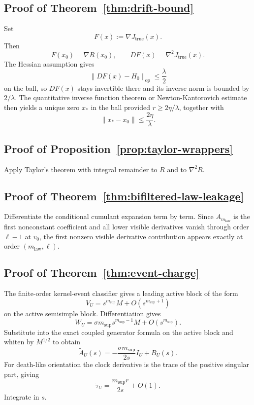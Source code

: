 \documentclass[11pt,a4paper]{article}
\numberwithin{equation}{section}
\theoremstyle{thmcompact}
\theoremstyle{remark}
\begin{document}
\subsection*{Proof of Theorem~\ref{thm:drift-bound}}
Set
\begin{equation}
F(x):=\nabla J_{\mathrm{true}}(x).
\end{equation}
Then
\begin{equation}
F(x_0)=\nabla R(x_0),
\qquad
DF(x)=\nabla^2J_{\mathrm{true}}(x).
\end{equation}
The Hessian assumption gives
\begin{equation}
\|DF(x)-H_0\|_{\mathrm{op}}\le \frac{\lambda}{2}
\end{equation}
on the ball, so $DF(x)$ stays invertible there and its inverse norm is bounded by $2/\lambda$. The quantitative inverse function theorem or Newton-Kantorovich estimate then yields a unique zero $x_*$ in the ball provided $r\ge 2\eta/\lambda$, together with
\begin{equation}
\|x_*-x_0\|\le \frac{2\eta}{\lambda}.
\end{equation}

\subsection*{Proof of Proposition~\ref{prop:taylor-wrappers}}
Apply Taylor's theorem with integral remainder to $R$ and to $\nabla^2R$.

\subsection*{Proof of Theorem~\ref{thm:bifiltered-law-leakage}}
Differentiate the conditional cumulant expansion term by term. Since $A_{m_{\mathrm{law}}}$ is the first nonconstant coefficient and all lower visible derivatives vanish through order $\ell-1$ at $v_0$, the first nonzero visible derivative contribution appears exactly at order $(m_{\mathrm{law}},\ell)$.

\subsection*{Proof of Theorem~\ref{thm:event-charge}}
The finite-order kernel-event classifier gives a leading active block of the form
\begin{equation}
V_U=s^{m_{\mathrm{sup}}}M+O(s^{m_{\mathrm{sup}}+1})
\end{equation}
on the active semisimple block. Differentiation gives
\begin{equation}
W_U=\sigma m_{\mathrm{sup}}s^{m_{\mathrm{sup}}-1}M+O(s^{m_{\mathrm{sup}}}).
\end{equation}
Substitute into the exact coupled generator formula on the active block and whiten by $M^{1/2}$ to obtain
\begin{equation}
\widetilde A_U(s)=-\frac{\sigma m_{\mathrm{sup}}}{2s}I_U+B_U(s).
\end{equation}
For death-like orientation the clock derivative is the trace of the positive singular part, giving
\begin{equation}
\dot\tau_U=\frac{m_{\mathrm{sup}}r}{2s}+O(1).
\end{equation}
Integrate in $s$.
\end{document}

